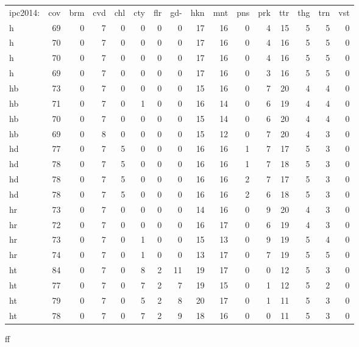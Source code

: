 \begin{center}
\begin{tabular}{lrrrrrrrrrrrrrrr}
ipc2014: & cov & brm & cvd & chl & cty & flr & gd- & hkn & mnt & pns & prk & ttr & thg & trn & vst\\
h & 69 & 0 & 7 & 0 & 0 & 0 & 0 & 17 & 16 & 0 & 4 & 15 & 5 & 5 & 0\\
h & 70 & 0 & 7 & 0 & 0 & 0 & 0 & 17 & 16 & 0 & 4 & 16 & 5 & 5 & 0\\
h & 70 & 0 & 7 & 0 & 0 & 0 & 0 & 17 & 16 & 0 & 4 & 16 & 5 & 5 & 0\\
h & 69 & 0 & 7 & 0 & 0 & 0 & 0 & 17 & 16 & 0 & 3 & 16 & 5 & 5 & 0\\
hb & 73 & 0 & 7 & 0 & 0 & 0 & 0 & 15 & 16 & 0 & 7 & 20 & 4 & 4 & 0\\
hb & 71 & 0 & 7 & 0 & 1 & 0 & 0 & 16 & 14 & 0 & 6 & 19 & 4 & 4 & 0\\
hb & 70 & 0 & 7 & 0 & 0 & 0 & 0 & 15 & 14 & 0 & 6 & 20 & 4 & 4 & 0\\
hb & 69 & 0 & 8 & 0 & 0 & 0 & 0 & 15 & 12 & 0 & 7 & 20 & 4 & 3 & 0\\
hd & 77 & 0 & 7 & 5 & 0 & 0 & 0 & 16 & 16 & 1 & 7 & 17 & 5 & 3 & 0\\
hd & 78 & 0 & 7 & 5 & 0 & 0 & 0 & 16 & 16 & 1 & 7 & 18 & 5 & 3 & 0\\
hd & 78 & 0 & 7 & 5 & 0 & 0 & 0 & 16 & 16 & 2 & 7 & 17 & 5 & 3 & 0\\
hd & 78 & 0 & 7 & 5 & 0 & 0 & 0 & 16 & 16 & 2 & 6 & 18 & 5 & 3 & 0\\
hr & 73 & 0 & 7 & 0 & 0 & 0 & 0 & 14 & 16 & 0 & 9 & 20 & 4 & 3 & 0\\
hr & 72 & 0 & 7 & 0 & 0 & 0 & 0 & 16 & 17 & 0 & 6 & 19 & 4 & 3 & 0\\
hr & 73 & 0 & 7 & 0 & 1 & 0 & 0 & 15 & 13 & 0 & 9 & 19 & 5 & 4 & 0\\
hr & 74 & 0 & 7 & 0 & 1 & 0 & 0 & 13 & 17 & 0 & 7 & 19 & 5 & 5 & 0\\
ht & 84 & 0 & 7 & 0 & 8 & 2 & 11 & 19 & 17 & 0 & 0 & 12 & 5 & 3 & 0\\
ht & 77 & 0 & 7 & 0 & 7 & 2 & 7 & 19 & 15 & 0 & 1 & 12 & 5 & 2 & 0\\
ht & 79 & 0 & 7 & 0 & 5 & 2 & 8 & 20 & 17 & 0 & 1 & 11 & 5 & 3 & 0\\
ht & 78 & 0 & 7 & 0 & 7 & 2 & 9 & 18 & 16 & 0 & 0 & 11 & 5 & 3 & 0\\
\end{tabular}
\end{center}

ff

